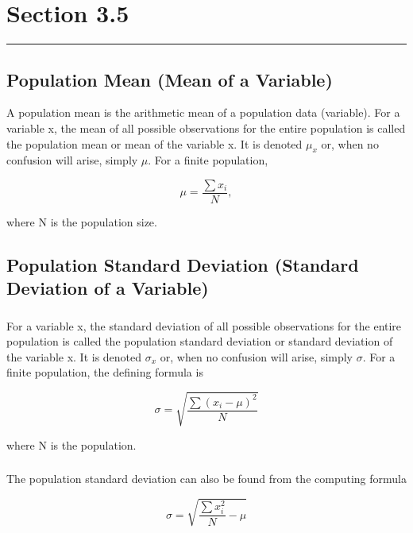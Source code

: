 \documentclass[12pt]{article}
\begin{document}
    \section*{Section 3.5}
    \noindent\rule{\textwidth}{0.4pt}
        \subsection*{Population Mean (Mean of a Variable)}
            A population mean is the arithmetic mean of a population data (variable). For a variable x, the mean of all possible observations
            for the entire population is called the population mean or mean of the variable x. It is denoted \(\mu_x\) or, when no confusion 
            will arise, simply \(\mu\). For a finite population,
            \begin{center}
                \[
                    \mu = \frac{\sum{x_i}}{N},    
                \]    
            \end{center}
            where N is the population size.
        \subsection*{Population Standard Deviation (Standard Deviation of a Variable)}
            \subsubsection*{}    
                For a variable x, the standard deviation of all possible observations for the entire population is called the population standard 
                deviation or standard deviation of the variable x. It is denoted \(\sigma_x\) or, when no confusion will arise, simply \(\sigma\). 
                For a finite population, the defining formula is
                \begin{center}
                    \[
                        \sigma = \sqrt{\frac{\sum(x_i-\mu)^2}{N}}
                    \]                
            \end{center}
                where N is the population.
            \subsubsection*{}
                The population standard deviation can also be found from the computing formula 
                \begin{center}
                    \[
                        \sigma = \sqrt{\frac{\sum x_i^2}{N}-\mu}
                    \]                    
                \end{center}
\end{document}
